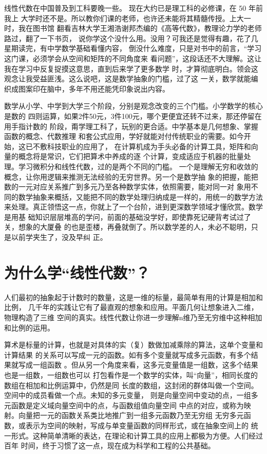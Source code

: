 线性代数在中国普及到工科要晚一些。 现在大约已是理工科的必修课，在 50 年前我上
大学时还不是。所以教你们课的老师，也许还未能将其精髓传授。上大一时，我在图书馆
翻看吉林大学王湘浩谢邦杰编的《高等代数》，教理论力学的老师路过，翻了一下书页，
说你学这个没什么用。没用？可我还是觉得有趣，花了几星期读完，有中学数学基础看懂内容，
倒没什么难度，只是对书中的前言，``学习这门课，必须学会从空间和矩阵的不同角度来
看问题''，这段话还不大理解。这让我在学习中反复捉摸这意思，直到后来学了更多数学
时，才算彻底明白。领会这观念让我受益匪浅。这么说吧，这是数学抽象的门槛，过了这
一关，数学就能编织成图案印在脑中，多年不用还能凭印象说出内容。

数学从小学、中学到大学三个阶段，分别是观念改变的三个门槛。小学数学的核心是数的
四则运算，如果2件50元，3件100元，哪个更便宜还转不过来，那还停留在用手指计数的
阶段，甭学理工科了，玩别的更合适。中学基本是几何想象、掌握函数的概念、代数推理
和套公式应用，学好就能对付传统职业的需要。如今开始，这已不敷科技职业的应用了，
在计算机成为手头必备的计算工具，矩阵和向量的概念将是常识，它们把算术中养成的逐
个计算，变成适应于机器的批量处理。学习微积分和线性代数，过的是两个不同的门槛。
一个是理解无穷和收敛的概念，让你用逻辑来推测无法经验的无穷世界。另一个是数学抽
象的把握，能把数的一元对应关系推广到多元乃至各种数学实体，依照需要，能对同一对
象用不同的数学抽象来概括，又能把不同的数学处理归纳成是一样的，用统一的数学方法
来处理。真正领悟这一点，你就上了一个台阶，进到更深数学领域才懂欣赏。数学是用基
础知识层层堆高的学问，前面的基础没学好，即使靠死记硬背考试过了关，想象的大厦叠
的也是歪楼，再叠就倒了。所以数学差的人，未必不聪明，只是以前学夹生了，没及早纠
正。

\section{为什么学``线性代数''？}
人们最初的抽象起于计数时的数量，这是一维的标量，最简单有用的计算是相加和比例，
几千年的实践让它有了最直观的想象和应用。平面几何让想象进入二维，物理构造了三维
空间的真实。线性代数让你进一步理解n维乃至无穷维中这种相加和比例的运用。

算术是标量的计算，也就是对具体的实（复）数做加减乘除的算法，这单个变量和计算结果
的关系可以写成一元的函数。如有多个变量就写成多元函数，有多个结果就写成一组函数
。但从另一个角度来看，这多元变量值是一组数，这多个结果也是一组数，一组数也可以
打包看作是一个数学的实体，叫``向量''，相同长度的数组在相加和比例运算中，仍然是同
长度的数组，这封闭的群体叫做一个空间。空间中的成员看做一个点。未知的多元变量，
则是向量空间中变动的点，一组多元函数是定义域向量空间中的点，与函数组值向量空间
中点的对应，或称为映射。向量把一元的函数关系类比地推广到一组多元函数乃至无穷组
无穷多元函数，或表示为空间的映射，写成与单变量函数的同样形式，或在抽象空间上的
统一形式。这种简单清晰的表达，在理论和计算工具的应用上都极为方便。人们经过百年
时间，终于习惯了这一点，现在成为科学和工程的公共基础。

